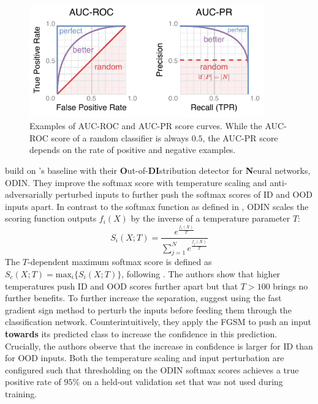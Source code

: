 \begin{figure}[ht]
    \centering
    \includegraphics[width=0.9\textwidth]{background/figures/auc-roc-pr.pdf}
    \caption[Examplary AUC-ROC and AUC-PR score curves.]{Examples of AUC-ROC and AUC-PR score curves. While the AUC-ROC score of a random classifier is always $0.5$, the AUC-PR score depends on the rate of positive and negative examples.}
    \label{fig:auc-roc-pr}
\end{figure}

\noindent \textcite{odin-detector-2017} build on \citeauthor{ood-baseline-2016}'s baseline with their \textbf{O}ut-of-\textbf{DI}stribution detector for \textbf{N}eural networks, ODIN. They improve the softmax score with temperature scaling and anti-adversarially perturbed inputs to further push the softmax scores of ID and OOD inputs apart. In contrast to the softmax function as defined in , ODIN scales the scoring function outputs $f_i(X)$ by the inverse of a temperature parameter $T$: 
\begin{equation*}
    S_i(X; T) = \frac{e^{\frac{f_i(X)}{T}}}{\sum_{j=1}^{N}e^{\frac{f_j(X)}{T}}}
\end{equation*}
The $T$-dependent maximum softmax score is defined as $S_{c}(X;T) = \text{max}_{i} \{ S_{i}(X;T) \}$, following . The authors show that higher temperatures push ID and OOD scores further apart but that $T > 100$ brings no further benefits. To further increase the separation, \citeauthor{odin-detector-2017} suggest using the fast gradient sign method \cite{fast-gradient-2014} to perturb the inputs before feeding them through the classification network. Counterintuitively, they apply the FGSM to push an input \textbf{towards} its predicted class to increase the confidence in this prediction. Crucially, the authors observe that the increase in confidence is larger for ID than for OOD inputs. Both the temperature scaling and input perturbation are configured such that thresholding on the ODIN softmax scores achieves a true positive rate of $95\%$ on a held-out validation set that was not used during training.

